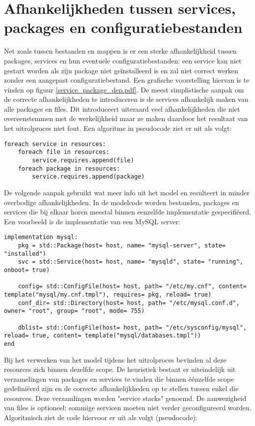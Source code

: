 \section{Afhankelijkheden tussen services, packages en configuratiebestanden}
\label{subs:services_packages_en_configuratiebestanden}
Net zoals tussen bestanden en mappen is er een sterke afhankelijkheid tussen packages, services en hun eventuele configuratiebestanden:
een service kan niet gestart worden als zijn package niet ge\"installeerd is en zal niet correct werken zonder een aangepast configuratiebestand.
Een grafische voorstelling hiervan is te vinden op figuur \ref{service_package_dep.pdf}.
De meest simplistische aanpak om de correcte afhankelijkheden te introduceren is de services afhankelijk maken van alle packages en files.
Dit introduceert uiteraard veel afhankelijkheden die niet overeenstemmen met de werkelijkheid maar ze maken daardoor het resultaat van het uitrolproces niet fout.
Een algoritme in pseudocode ziet er uit als volgt:
\begin{lstlisting}
foreach service in resources:
    foreach file in resources:
        service.requires.append(file)
    foreach package in resources:
        service.requires.append(package)
\end{lstlisting}

De volgende aanpak gebruikt wat meer info uit het model en resulteert in minder overbodige afhankelijkheden.
In de modelcode worden bestanden, packages en services die bij elkaar horen meestal binnen eenzelfde implementatie gespecifi\"eerd.
Een voorbeeld is de implementatie van een MySQL server:
\begin{lstlisting}
implementation mysql:
    pkg = std::Package(host= host, name= "mysql-server", state= "installed")
    svc = std::Service(host= host, name= "mysqld", state= "running", onboot= true)

    config= std::ConfigFile(host= host, path= "/etc/my.cnf", content= template("mysql/my.cnf.tmpl"), requires= pkg, reload= true)
    conf_dir= std::Directory(host= host, path= "/etc/mysql.conf.d", owner= "root", group= "root", mode= 755)

    dblist= std::ConfigFile(host= host, path= "/etc/sysconfig/mysql", reload= true, content= template("mysql/databases.tmpl"))
end
\end{lstlisting}

Bij het verwerken van het model tijdens het uitrolproces bevinden al deze resources zich binnen dezelfde scope.
De heuristiek bestaat er uiteindelijk uit verzamelingen van packages en services te vinden die binnen \'e\'enzelfde scope gedefini\"eerd zijn en de correcte afhankelijkheden op te stellen tussen enkel die resources.
Deze verzamlingen worden "service stacks" genoemd.
De aanwezigheid van files is optioneel: sommige servicen moeten niet verder geconfigureerd worden.
Algoritmisch ziet de code hiervoor  er uit als volgt (pseudocode):

